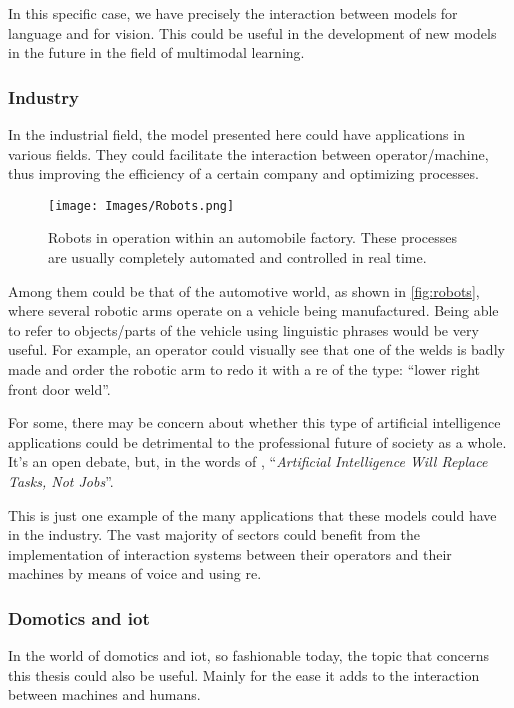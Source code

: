 In this specific case, we have precisely the interaction between models for
language and for vision. This could be useful in the development of new models
in the future in the field of multimodal learning.

\subsubsection{Industry}
In the industrial field, the model presented here could have applications in
various fields. They could facilitate the interaction between operator/machine,
thus improving the efficiency of a certain company and optimizing processes.

\begin{figure}[ht]
  \centering
  \texttt{[image: Images/Robots.png]}
  \caption[Robots in automobile factory]{Robots in operation within an
    automobile factory. These processes are usually completely automated and
    controlled in real time.}
  \label{fig:robots}
\end{figure}

Among them could be that of the automotive world, as shown in
\vref{fig:robots}, where several robotic arms operate on a vehicle being
manufactured. Being able to refer to objects/parts of the vehicle using
linguistic phrases would be very useful. For example, an operator could
visually see that one of the welds is badly made and order the robotic arm to
redo it with a \gls{re} of the type: ``lower right front door weld''.

\begin{remarkBox}
  For some, there may be concern about whether this type of artificial
  intelligence applications could be detrimental to the professional future of
  society as a whole. It's an open debate, but, in the words of
  \citeauthor*{contributor18:artif_intel_will_replac_tasks_not_jobs}
  \cite{contributor18:artif_intel_will_replac_tasks_not_jobs},
  ``\textit{Artificial Intelligence Will Replace Tasks, Not Jobs}''.
\end{remarkBox}

This is just one example of the many applications that these models could have
in the industry. The vast majority of sectors could benefit from the
implementation of interaction systems between their operators and their
machines by means of voice and using \gls{re}.

\subsubsection{Domotics and \acs*{iot}}
In the world of domotics and \gls{iot}, so fashionable today, the topic that
concerns this thesis could also be useful. Mainly for the ease it adds to the
interaction between machines and humans.

